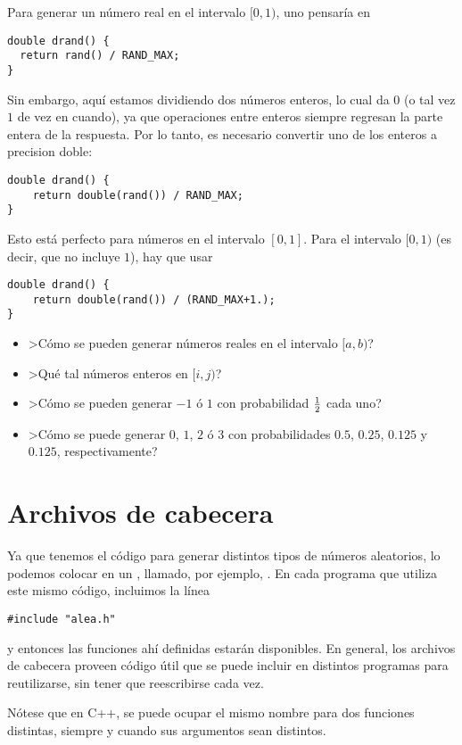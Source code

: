 Para generar un número real en el intervalo $[0,1)$, uno pensaría en
\begin{lstlisting}
double drand() { 
  return rand() / RAND_MAX;
}
\end{lstlisting}
Sin embargo, aquí estamos dividiendo dos números enteros, lo cual da $0$ (o tal
vez $1$ de vez en cuando), ya que operaciones entre enteros siempre regresan la
parte entera de la respuesta. Por lo tanto, es necesario convertir uno de los
enteros a precision doble:
\begin{lstlisting}
double drand() {
	return double(rand()) / RAND_MAX;
}
\end{lstlisting}
Esto está perfecto para números en el intervalo $[0,1]$. Para el intervalo
$[0,1)$ (es decir, que no incluye $1$), 
hay que usar
\begin{lstlisting}
double drand() {
	return double(rand()) / (RAND_MAX+1.);
}
\end{lstlisting}

\ejercicio
\begin{itemize}
\item >Cómo se pueden generar números reales en el intervalo $[a,b)$?
\item >Qué tal números enteros en $[i,j)$?
\item >Cómo se pueden generar $-1$ ó $1$ con probabilidad $\textstyle \frac{1}{2}$
cada uno?
\item >Cómo se puede generar $0$, $1$, $2$ ó $3$ con probabilidades $0.5$,
$0.25$, $0.125$ y $0.125$, respectivamente?
\end{itemize}

\section{Archivos de cabecera}

Ya que tenemos el código para generar distintos tipos de números aleatorios, lo
podemos colocar en un , llamado, por ejemplo,
.  En cada programa que utiliza este mismo código,  incluimos
la línea
\begin{lstlisting}
#include "alea.h"
\end{lstlisting}
y entonces las funciones ahí definidas estarán disponibles.
En general, los archivos de cabecera proveen código útil que se puede incluir
en distintos programas para reutilizarse, sin tener que reescribirse cada vez.



Nótese que en C++, se puede ocupar el mismo nombre para dos funciones
distintas, siempre y cuando sus argumentos sean distintos.


